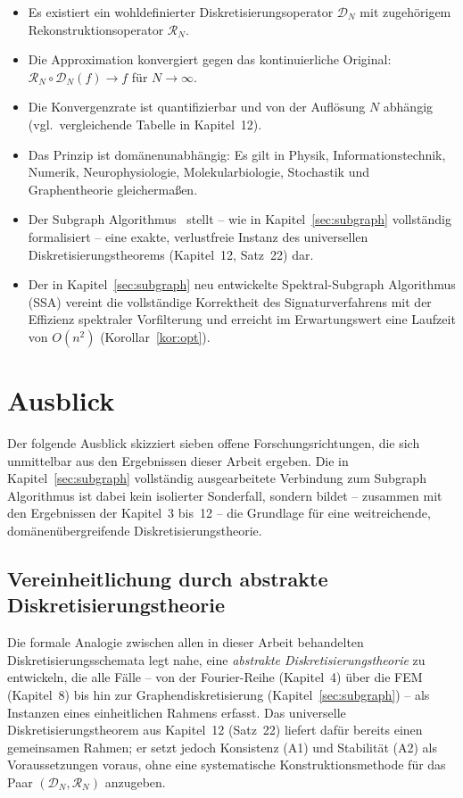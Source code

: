 ﻿\documentclass[a4paper,12pt]{article}
\theoremstyle{definition}
\begin{document}
\begin{itemize}
    \item Es existiert ein wohldefinierter Diskretisierungsoperator $\mathcal{D}_N$ mit zugehörigem Rekonstruktionsoperator $\mathcal{R}_N$.
    \item Die Approximation konvergiert gegen das kontinuierliche Original: $\mathcal{R}_N \circ \mathcal{D}_N(f) \to f$ für $N \to \infty$.
    \item Die Konvergenzrate ist quantifizierbar und von der Auflösung $N$ abhängig (vgl.\ vergleichende Tabelle in Kapitel~12).
    \item Das Prinzip ist domänenunabhängig: Es gilt in Physik, Informationstechnik, Numerik, Neurophysiologie, Molekularbiologie, Stochastik und Graphentheorie gleichermaßen.
    \item Der Subgraph Algorithmus~\cite{epp2026subgraph} stellt -- wie in Kapitel~\ref{sec:subgraph} vollständig formalisiert -- eine exakte, verlustfreie Instanz des universellen Diskretisierungstheorems (Kapitel~12, Satz~22) dar.
    \item Der in Kapitel~\ref{sec:subgraph} neu entwickelte Spektral-Subgraph Algorithmus (SSA) vereint die vollständige Korrektheit des Signaturverfahrens mit der Effizienz spektraler Vorfilterung und erreicht im Erwartungswert eine Laufzeit von $O(n^2)$ (Korollar~\ref{kor:opt}).
\end{itemize}

\section{Ausblick}
\label{sec:ausblick}

Der folgende Ausblick skizziert sieben offene Forschungsrichtungen, die sich unmittelbar aus
den Ergebnissen dieser Arbeit ergeben. Die in Kapitel~\ref{sec:subgraph} vollständig
ausgearbeitete Verbindung zum Subgraph Algorithmus ist dabei kein isolierter Sonderfall,
sondern bildet -- zusammen mit den Ergebnissen der Kapitel~3 bis~12 -- die Grundlage für
eine weitreichende, domänenübergreifende Diskretisierungstheorie.

\subsection{Vereinheitlichung durch abstrakte Diskretisierungstheorie}

Die formale Analogie zwischen allen in dieser Arbeit behandelten Diskretisierungsschemata
legt nahe, eine \emph{abstrakte Diskretisierungstheorie} zu entwickeln, die alle Fälle --
von der Fourier-Reihe (Kapitel~4) über die FEM (Kapitel~8) bis hin zur
Graphendiskretisierung (Kapitel~\ref{sec:subgraph}) -- als Instanzen eines einheitlichen
Rahmens erfasst. Das universelle Diskretisierungstheorem aus Kapitel~12 (Satz~22) liefert
dafür bereits einen gemeinsamen Rahmen; er setzt jedoch Konsistenz (A1) und Stabilität (A2)
als Voraussetzungen voraus, ohne eine systematische Konstruktionsmethode für das Paar
$(\mathcal{D}_N, \mathcal{R}_N)$ anzugeben.
\end{document}
